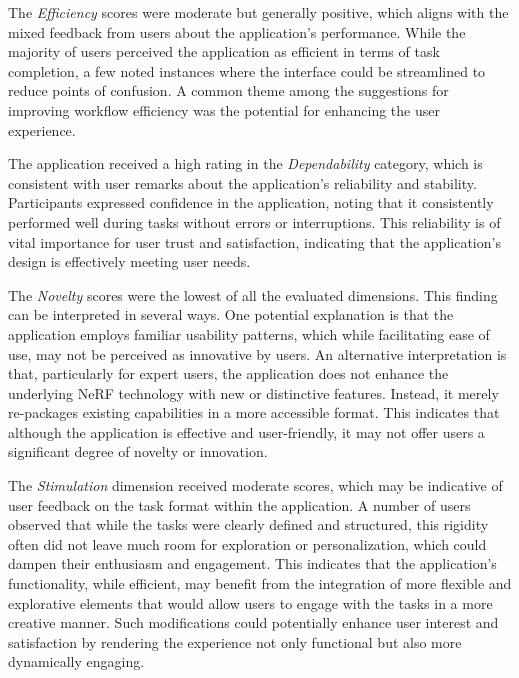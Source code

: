 The \emph{Efficiency} scores were moderate but generally positive, which aligns with the mixed feedback from users about the application's performance. 
While the majority of users perceived the application as efficient in terms of task completion, a few noted instances where the interface could be streamlined to reduce points of confusion.
A common theme among the suggestions for improving workflow efficiency was the potential for enhancing the user experience.

The application received a high rating in the \emph{Dependability} category, which is consistent with user remarks about the application’s reliability and stability.
Participants expressed confidence in the application, noting that it consistently performed well during tasks without errors or interruptions. 
This reliability is of vital importance for user trust and satisfaction, indicating that the application’s design is effectively meeting user needs.

The \emph{Novelty} scores were the lowest of all the evaluated dimensions. This finding can be interpreted in several ways. 
One potential explanation is that the application employs familiar usability patterns, which while facilitating ease of use, may not be perceived as innovative by users. 
An alternative interpretation is that, particularly for expert users, the application does not enhance the underlying NeRF technology with new or distinctive features.
Instead, it merely re-packages existing capabilities in a more accessible format. 
This indicates that although the application is effective and user-friendly, it may not offer users a significant degree of novelty or innovation.

The \emph{Stimulation} dimension received moderate scores, which may be indicative of user feedback on the task format within the application. 
A number of users observed that while the tasks were clearly defined and structured, this rigidity often did not leave much room for exploration or personalization, which could dampen their enthusiasm and engagement. 
This indicates that the application's functionality, while efficient, may benefit from the integration of more flexible and explorative elements that would allow users to engage with the tasks in a more creative manner. 
Such modifications could potentially enhance user interest and satisfaction by rendering the experience not only functional but also more dynamically engaging.

